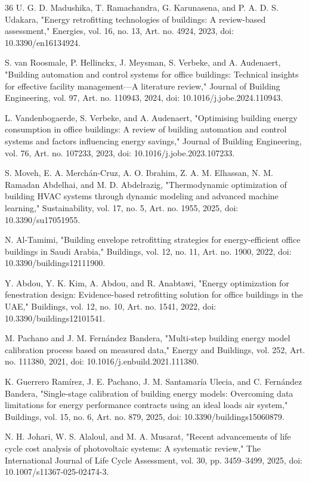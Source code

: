 \documentclass[journal,fleqn]{IEEEtran}
\begin{document}
\begin{thebibliography}{36}
 U. G. D. Madushika, T. Ramachandra, G. Karunasena, and P. A. D. S. Udakara, "Energy retrofitting technologies of buildings: A review-based assessment," Energies, vol. 16, no. 13, Art. no. 4924, 2023, doi: 10.3390/en16134924.

 S. van Roosmale, P. Hellinckx, J. Meysman, S. Verbeke, and A. Audenaert, "Building automation and control systems for office buildings: Technical insights for effective facility management---A literature review," Journal of Building Engineering, vol. 97, Art. no. 110943, 2024, doi: 10.1016/j.jobe.2024.110943.

 L. Vandenbogaerde, S. Verbeke, and A. Audenaert, "Optimising building energy consumption in office buildings: A review of building automation and control systems and factors influencing energy savings," Journal of Building Engineering, vol. 76, Art. no. 107233, 2023, doi: 10.1016/j.jobe.2023.107233.

 S. Moveh, E. A. Merchán-Cruz, A. O. Ibrahim, Z. A. M. Elhassan, N. M. Ramadan Abdelhai, and M. D. Abdelrazig, "Thermodynamic optimization of building HVAC systems through dynamic modeling and advanced machine learning," Sustainability, vol. 17, no. 5, Art. no. 1955, 2025, doi: 10.3390/su17051955.

 N. Al-Tamimi, "Building envelope retrofitting strategies for energy-efficient office buildings in Saudi Arabia," Buildings, vol. 12, no. 11, Art. no. 1900, 2022, doi: 10.3390/buildings12111900.

 Y. Abdou, Y. K. Kim, A. Abdou, and R. Anabtawi, "Energy optimization for fenestration design: Evidence-based retrofitting solution for office buildings in the UAE," Buildings, vol. 12, no. 10, Art. no. 1541, 2022, doi: 10.3390/buildings12101541.

 M. Pachano and J. M. Fernández Bandera, "Multi-step building energy model calibration process based on measured data," Energy and Buildings, vol. 252, Art. no. 111380, 2021, doi: 10.1016/j.enbuild.2021.111380.

 K. Guerrero Ramírez, J. E. Pachano, J. M. Santamaría Ulecia, and C. Fernández Bandera, "Single-stage calibration of building energy models: Overcoming data limitations for energy performance contracts using an ideal loads air system," Buildings, vol. 15, no. 6, Art. no. 879, 2025, doi: 10.3390/buildings15060879.

 N. H. Johari, W. S. Alaloul, and M. A. Musarat, "Recent advancements of life cycle cost analysis of photovoltaic systems: A systematic review," The International Journal of Life Cycle Assessment, vol. 30, pp. 3459--3499, 2025, doi: 10.1007/s11367-025-02474-3.


\end{thebibliography}
\end{document}
